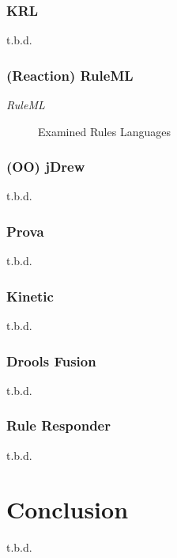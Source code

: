\documentclass[11pt]{article}%
\begin{document}
\subsubsection{KRL}
t.b.d.

\subsubsection{(Reaction) RuleML}
\textit{RuleML}~\cite{2006-Boley-RuleML.pdf}
\begin{figure}[htb]
\centering
\caption{Examined Rules Languages }
\end{figure}

\subsubsection{(OO) jDrew}
t.b.d.


\subsubsection{Prova}
t.b.d.


\subsubsection{Kinetic}
t.b.d.


\subsubsection{Drools Fusion}
t.b.d.


\subsubsection{Rule Responder}
t.b.d.


\section{Conclusion}
t.b.d.
\end{document}
